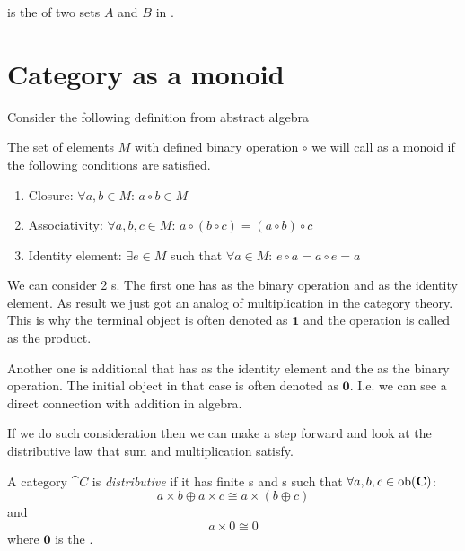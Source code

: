 \begin{example}
  \label{ex:set_sum}
   is the  of two sets $A$ and $B$ in
  .  
\end{example}


\section{Category as a monoid}
\label{sec:category_as_monoid}
Consider the following definition from abstract algebra
\begin{definition}[Monoid]
  \label{def:monoid}
  The set of elements $M$ with defined binary operation $\circ$ we will call
  as a monoid if the following conditions are satisfied.
  \begin{enumerate}
  \item Closure: $\forall a, b \in M$: $a \circ b \in M$
  \item Associativity: $\forall a, b, c \in M$:
    $a \circ \left( b \circ c \right) =
    \left( a \circ b \right) \circ c$
  \item Identity element: $\exists e \in M$ such that
    $\forall a \in M$: $e \circ a = a \circ e = a$
  \end{enumerate}
\end{definition}

We can consider 2 s. The first one has
 as the binary operation and
 as the identity element. As result we
just got an analog of multiplication in the category theory. This is why
the terminal object is often denoted as $\mathbf{1}$ and the operation
is called as the product. 

Another one is additional  that has
 as the identity element and the
 as the binary operation. The initial object in
that case  is often denoted as $\mathbf{0}$. I.e. we can see a direct
connection with addition in algebra.

If we do such consideration then we can make a step forward and look
at the distributive law that sum and multiplication satisfy.
\begin{definition}
\label{def:distributive_category}
A category $\cat{C}$ is \textit{distributive} if 
\cite{wiki:distributive_category}
it has finite
s and s such that 
$\forall a,b,c \in \mathrm{ob}(\mathbf{C})$:
\[
a \times b \oplus a \times c \cong a \times ( b \oplus c )
\]
and 
\[
a \times 0 \cong 0
\]
where $\mathbf{0}$ is the .
\end{definition} 

